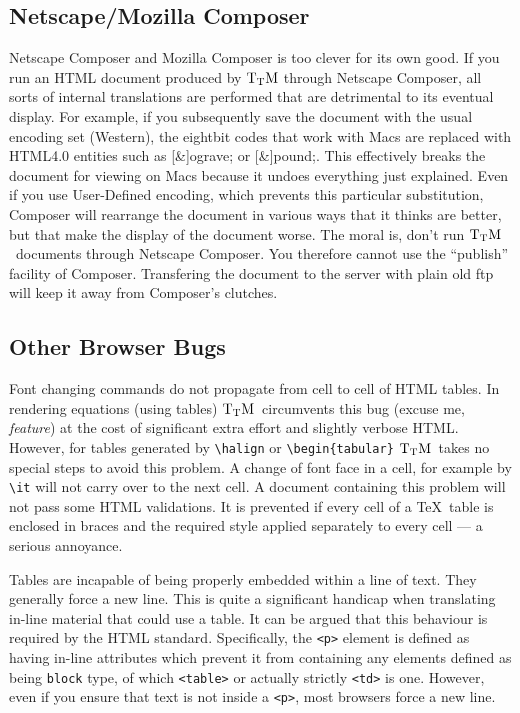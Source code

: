 \documentclass[12pt]{article}
\def\TtM{$\rm{}T_TH$}
\def\TtM{$\rm{}T_TM$}%
\begin{document}
\subsection{Netscape/Mozilla Composer}
\label{nscomp}
Netscape Composer and Mozilla Composer is
too clever for its own good. If you run an HTML document produced by \TtM
through Netscape Composer, all sorts of internal translations are
performed that are detrimental to its eventual display. For example,
if you subsequently save the document with the usual encoding set
(Western), the eightbit codes that work with Macs are replaced with
HTML4.0 entities such as [\&]ograve; or [\&]pound;. This effectively
breaks the document for viewing on Macs because it undoes everything
just explained. Even if you use User-Defined encoding, which prevents
this particular substitution, Composer will rearrange the document in
various ways that it thinks are better, but that make the display of
the document worse. The moral is, don't run \TtM\ documents through
Netscape Composer.
  You therefore cannot use the ``publish'' facility
of Composer. Transfering the document to the server with plain old ftp
will keep it away from Composer's clutches.


\subsection{Other Browser Bugs}

\label{cellbug}

Font changing commands do not propagate from cell to cell of HTML
tables. In rendering equations (using tables) \TtM\ circumvents this
bug (excuse me, \emph{feature}) at the cost of significant extra effort and
slightly verbose HTML.  However, for tables generated by
\verb+\halign+ or \verb+\begin{tabular}+ \TtM\ takes no special steps
to avoid this problem. A change of font face in a cell, for example by
\verb+\it+ will not carry over to the next cell.  A document
containing this problem will not pass some HTML validations.  It is
prevented if every cell of a \TeX\ table is enclosed in braces and the
required style applied separately to every cell --- a serious
annoyance.

\label{tablebug}
Tables are incapable of being properly embedded within a line of text.
They generally force a new line. This is quite a significant handicap
when translating in-line material that could use a table. It can be
argued that this behaviour is required by the HTML
standard. Specifically, the \verb!<p>! element is defined as having
in-line attributes which prevent it from containing any elements
defined as being \verb!block! type, of which \verb!<table>! or
actually strictly \verb!<td>! is one. However, even if you ensure that
text is not inside a \verb!<p>!, most browsers force a new line.
\end{document}

